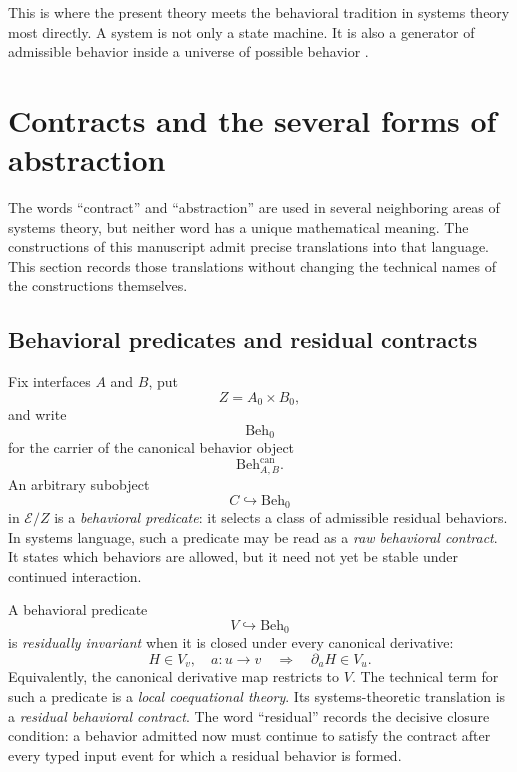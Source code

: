 This is where the present theory meets the behavioral tradition in systems
theory most directly.  A system is not only a state machine.  It is also a
generator of admissible behavior inside a universe of possible behavior
\cite{Willems2007BehavioralApproach,AdamDahleh2019AbstractBehavioralApproach}.

\section{Contracts and the several forms of abstraction}
\label{sec:contracts-and-abstraction}

The words ``contract'' and ``abstraction'' are used in several neighboring
areas of systems theory, but neither word has a unique mathematical meaning.
The constructions of this manuscript admit precise translations into that
language.  This section records those translations without changing the
technical names of the constructions themselves.

\subsection{Behavioral predicates and residual contracts}
\label{subsec:behavioral-predicates-residual-contracts}

Fix interfaces \(A\) and \(B\), put
\[
  Z=A_0\times B_0,
\]
and write
\[
  \mathrm{Beh}_0
\]
for the carrier of the canonical behavior object
\[
  \mathrm{Beh}^{\mathrm{can}}_{A,B}.
\]
An arbitrary subobject
\[
  C\hookrightarrow \mathrm{Beh}_0
\]
in \(\mathcal E/Z\) is a \emph{behavioral predicate}: it selects a class of
admissible residual behaviors.  In systems language, such a predicate may be
read as a \emph{raw behavioral contract}.  It states which behaviors are
allowed, but it need not yet be stable under continued interaction.

A behavioral predicate
\[
  V\hookrightarrow \mathrm{Beh}_0
\]
is \emph{residually invariant} when it is closed under every canonical
derivative:
\[
  H\in V_v,\quad a:u\to v
  \quad\Longrightarrow\quad
  \partial_aH\in V_u.
\]
Equivalently, the canonical derivative map restricts to \(V\).  The technical
term for such a predicate is a \emph{local coequational theory}.  Its
systems-theoretic translation is a \emph{residual behavioral contract}.  The
word ``residual'' records the decisive closure condition: a behavior admitted
now must continue to satisfy the contract after every typed input event for
which a residual behavior is formed.

